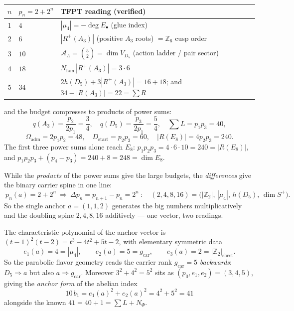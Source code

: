 \documentclass[11pt,a4paper]{article}
\newcommand{\gcar}{g_{\mathrm{car}}}
\newcommand{\Nfam}{N_{\mathrm{fam}}}
\newcommand{\Oadm}{\Omega_{\mathrm{adm}}}
\newcommand{\AL}{\mathcal A_\Lambda}
\newcommand{\Z}{\mathbb{Z}}
\theoremstyle{definition}
\renewcommand{\arraystretch}{1.15}
\begin{document}
\begin{center}\small
\renewcommand{\arraystretch}{1.2}
\begin{tabularx}{\linewidth}{@{}clY@{}}
\toprule
$n$ & $p_n=2+2^n$ & \textbf{TFPT reading (verified)} \\
 & $4$ & $|\mu_4|=-\deg E_\bullet$ (glue index) \\
2 & $6$ & $|R^+(A_3)|$ (positive $A_3$ roots) $=\Z_6$ cusp order \\
3 & $10$ & $\AL=\binom52=\dim V_{D_5}$ (action ladder / pair sector) \\
4 & $18$ & $\Nfam\,|R^+(A_3)|=3\cdot6$ \\
5 & $34$ & $2h(D_5)+3|R^+(A_3)|=16+18$; and $34-|R(A_3)|=22=\sum R$ \\
\bottomrule
\end{tabularx}
\end{center}

\noindent and the budget compresses to products of power sums:
\[
  q(A_3)=\frac{p_2}{2p_1}=\frac34,\quad q(D_5)=\frac{p_3}{2p_1}=\frac54,\quad
  \textstyle\sum L=p_1p_3=40,
\]
\[
  \Oadm=2p_1p_2=48,\quad D_{\mathrm{start}}=p_2p_3=60,\quad |R(E_8)|=4p_2p_3=240.
\]
The first three power sums alone reach $E_8$: $p_1p_2p_3=4\cdot6\cdot10=240=|R(E_8)|$, and
$p_1p_2p_3+(p_4-p_3)=240+8=248=\dim E_8$.

\begin{winbox}
While the \emph{products} of the power sums give the large budgets, the \emph{differences} give the
binary carrier spine in one line:
\[
  \boxed{\ p_n(a)=2+2^n\ \Longrightarrow\ \Delta p_n=p_{n+1}-p_n=2^n\ }:\quad
  (2,4,8,16)=\bigl(|\Z_2|,\,|\mu_4|,\,h(D_5),\,\dim S^+\bigr).
\]
So the single anchor $a=(1,1,2)$ generates the big numbers multiplicatively and the doubling spine
$2,4,8,16$ additively --- one vector, two readings.
\end{winbox}

\begin{winbox}
The characteristic polynomial of the anchor vector is $(t-1)^2(t-2)=t^3-4t^2+5t-2$, with elementary
symmetric data
\[
  e_1(a)=4=|\mu_4|,\qquad e_2(a)=5=\gcar,\qquad e_3(a)=2=|\Z_2|_{\mathrm{sheet}} .
\]
So the parabolic flavor geometry reads the carrier rank $\gcar=5$ \emph{backwards}: $D_5\Rightarrow a$ but
also $a\Rightarrow\gcar$. Moreover $3^2+4^2=5^2$ sits as $(p_0,e_1,e_2)=(3,4,5)$, giving the
\emph{anchor form} of the abelian index
\[
  \boxed{\ 10\,b_1=e_1(a)^2+e_2(a)^2=4^2+5^2=41\ }
\]
alongside the known $41=40+1=\sum L+N_\Phi$. \mE
\end{winbox}
\end{document}
